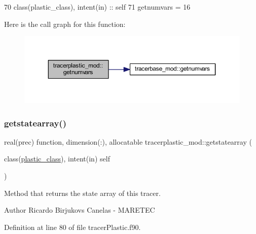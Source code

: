 \begin{DoxyCode}
70     \textcolor{keywordtype}{class}(plastic\_class), \textcolor{keywordtype}{intent(in)} :: self
71     getnumvars = 16
\end{DoxyCode}
Here is the call graph for this function\+:\nopagebreak
\begin{figure}[H]
\begin{center}
\leavevmode
\includegraphics[width=350pt]{namespacetracerplastic__mod_aa5367c2562d10b5393f263394f07fa49_cgraph}
\end{center}
\end{figure}
\mbox{\label{namespacetracerplastic__mod_aa8cdd2196261b216dd6cdd5b7ef2fe90}} 
\subsubsection{\texorpdfstring{getstatearray()}{getstatearray()}}
{\footnotesize\ttfamily real(prec) function, dimension(\+:), allocatable tracerplastic\+\_\+mod\+::getstatearray (\begin{DoxyParamCaption}\item[{class(\mbox{\hyperlink{structtracerplastic__mod_1_1plastic__class}{plastic\+\_\+class}}), intent(in)}]{self }\end{DoxyParamCaption})\hspace{0.3cm}{\ttfamily [private]}}



Method that returns the state array of this tracer. 

\begin{DoxyAuthor}{Author}
Ricardo Birjukovs Canelas -\/ M\+A\+R\+E\+T\+EC 
\end{DoxyAuthor}


Definition at line 80 of file tracer\+Plastic.\+f90.



